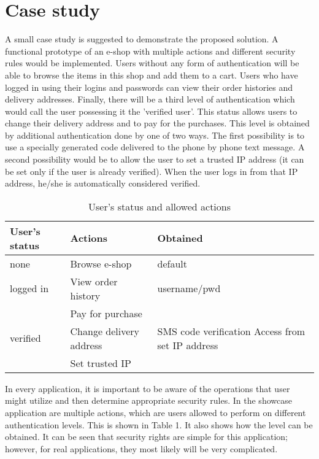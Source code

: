 \documentclass{sig-alternate}
\begin{document}
\section{Case study}
A small case study is suggested to demonstrate the proposed solution.  A functional prototype of an e-shop with multiple actions and different security rules would be implemented. Users without any form of authentication will be able to browse the items in this shop and add them to a cart. Users who have logged in using their logins and passwords can view their order histories and delivery addresses. Finally, there will be a third level of authentication which would call the user possessing it the 'verified user'. This status allows users to change their delivery address and to pay for the purchases. This level is obtained by additional authentication done by one of two ways. The first possibility is to use a specially generated code delivered to the phone by phone text message. A second possibility would be to allow the user to set a trusted IP address (it can be set only if the user is already verified). When the user logs in from that IP address, he/she is automatically considered verified.

\begin{table}
\vspace{3px}
\begin{tabular}{|m{2cm}|m{2.5cm}|m{3cm}|} \hline
User's status&Actions&Obtained\\ \hline
none & Browse e-shop & default\\ \hline
logged in & View order \newline history & username/pwd\\ \hline
 & Pay for purchase & \multirow{3}{*}{\parbox[t][][c]{3cm}{SMS code verification \newline Access from set IP address}} \\[5pt]
verified & Change delivery address &  \\[5pt] 
 & Set trusted IP & \\[5pt]
\hline\end{tabular}
\vspace{-0.8em}
\caption{User's status and allowed actions}
\vspace{-1em}
\end{table}

In every application, it is important to be aware of the operations that user might utilize and then determine appropriate security rules. In the showcase application are multiple actions, which are users allowed to perform on different authentication levels. This is shown in Table 1. It also shows how the level can be obtained. It can be seen that security rights are simple for this application; however, for real applications, they most likely will be very complicated.
\end{document}
